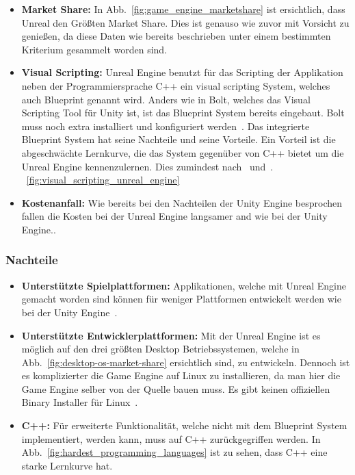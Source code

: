 \begin{itemize}
    \item \textbf{Market Share:} In Abb.~\ref{fig:game_engine_marketshare} ist ersichtlich, dass Unreal den Größten Market Share.
    Dies ist genauso wie zuvor mit Vorsicht zu genießen, da diese Daten wie bereits beschrieben unter einem bestimmten Kriterium gesammelt worden sind.
    \item \textbf{Visual Scripting:} Unreal Engine benutzt für das Scripting der Applikation neben der Programmiersprache C++ ein visual scripting System, welches auch Blueprint genannt wird.
    Anders wie in Bolt, welches das Visual Scripting Tool für Unity ist, ist das Blueprint System bereits eingebaut.
    Bolt muss noch extra installiert und konfiguriert werden~\cite{Unity_Bolt}.
    Das integrierte Blueprint System hat seine Nachteile und seine Vorteile.
    Ein Vorteil ist die abgeschwächte Lernkurve, die das System gegenüber von C++ bietet um die Unreal Engine kennenzulernen.
    Dies zumindest nach~\cite{Mower_UnrealEngine} und~\cite{jwatte_2017}.
    ~\ref{fig:visual_scripting_unreal_engine}
    \item \textbf{Kostenanfall:} Wie bereits bei den Nachteilen der Unity Engine besprochen fallen die Kosten bei der Unreal Engine langsamer and wie bei der Unity Engine..\cite{UNREAL_ENGINE_PRICING_2022, Unity_Pricing_2}
\end{itemize}

\subsubsection{Nachteile}

\begin{itemize}
    \item \textbf{Unterstützte Spielplattformen:} Applikationen, welche mit Unreal Engine gemacht worden sind können für weniger Plattformen entwickelt werden wie bei der Unity Engine~\cite{Viscirele_Unreal_v_Unity}.
    \item \textbf{Unterstützte Entwicklerplattformen:} Mit der Unreal Engine ist es möglich auf den drei größten Desktop Betriebssystemen, welche in Abb.~\ref{fig:desktop-os-market-share} ersichtlich sind, zu entwickeln.
    Dennoch ist es komplizierter die Game Engine auf Linux zu installieren, da man hier die Game Engine selber von der Quelle bauen muss.
    Es gibt keinen offiziellen Binary Installer für Linux~\cite{Unreal_Installationsguide}.
    \item \textbf{C++:} Für erweiterte Funktionalität, welche nicht mit dem Blueprint System implementiert, werden kann, muss auf C++ zurückgegriffen werden.
    In Abb.~\ref{fig:hardest_programming_languages} ist zu sehen, dass C++ eine starke Lernkurve hat.
\end{itemize}


